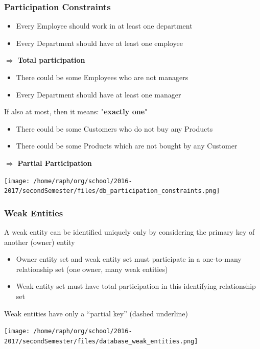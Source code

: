 \documentclass[11pt]{article}
\begin{document}
\subsubsection{Participation Constraints}
\label{sec:orgebca9ad}
\begin{itemize}
\item Every Employee should work in at least one department
\item Every Department should have at least one employee
\end{itemize}
\(\Rightarrow\) \textbf{Total participation}

\begin{itemize}
\item There could be some Employees who are not managers
\item Every Department should have at least one manager
\end{itemize}
If also at most, then it means: "\textbf{exactly one}"

\begin{itemize}
\item There could be some Customers who do not buy any Products
\item There could be some Products which are not bought by any Customer
\end{itemize}
\(\Rightarrow\) \textbf{Partial Participation}

\begin{center}
\texttt{[image: /home/raph/org/school/2016-2017/secondSemester/files/db\_participation\_constraints.png]}
\end{center}
\subsubsection{Weak Entities}
\label{sec:orgd84bcd2}
A weak entity can be identified uniquely only by considering the primary key of
another (owner) entity
\begin{itemize}
\item Owner entity set and weak entity set must participate in a one-to-many
relationship set (one owner, many weak entities)
\item Weak entity set must have total participation in this identifying relationship
set
\end{itemize}
Weak entities have only a “partial key” (dashed underline)
\begin{center}
\texttt{[image: /home/raph/org/school/2016-2017/secondSemester/files/database\_weak\_entities.png]}
\end{center}
\end{document}
